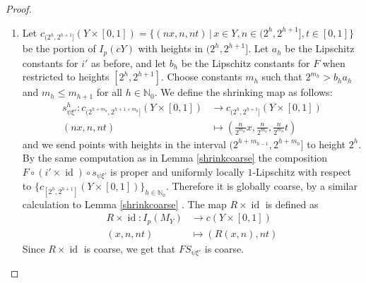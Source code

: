 \documentclass[a4paper,11pt]{article}
\theoremstyle{definition}
\theoremstyle{plain}
\theoremstyle{remark}
\DeclareMathOperator{\id}{id}
\begin{document}
{\begin{proof}
\begin{enumerate}
Let $b_{h}$ be the Lipschitz constant of $\xi'$ (thought of as a map $\tilde{M}_{Y}\rightarrow M_{X}$) restricted to the set $\coprod_{k\leq h} \tilde{M}^h$. By previous arguments, after descending to the quotient, $b_h$ is an approxiate Lipschitz constant for $M_{[1,2^{h+1}]} \subset M_{Y}$ with the subspace metric as well as for $\pi (\tilde{M}^h)$ equipped with the path metric. Since $i'$ is height-preserving, the composition $\xi'i'$ has Lipschitz constant $b_{h}a_{h}$. Choose constants $m_{h}$ such that $2^{m_{h}}>b_{h}a_{h}$ and $m_{h}\leq m_{h+1}$ for all $h\in \mathbb{N}_{0}$. By the same construction as in Lemma \ref{shrinkcoarse} we can define a shrinking map $s_{\xi'}$ such that the composition $\xi' i' s_{\xi'}$ is proper and  uniformly locally $1$-Lipschitz with respect to $\{c_{[2^h,2^{h+1}]} Y\}_{h\in \mathbb{N}_{0}}$. Note that we had to make the map $i'$ continuous rather than just coarse, because even a uniformly bounded discontinuity can become arbitrarily large under post-composition with $\xi'$ if the Lipschitz constants $b_{h}$ are unbounded. Precomposing with the coarse map $R$ gives us the desired result.

\item Let $c_{(2^{h},2^{h+1}]}(Y\times [0,1]) = \{(nx,n,nt)\,|\, x\in Y,  n \in (2^{h},2^{h+1}], t\in [0,1]\}$ be the portion of $I_{p}(cY)$ with heights in $(2^{h},2^{h+1}]$. Let $a_{h}$ be the Lipschitz constants for $i'$ as before, and let $b_{h}$ be the Lipschitz constants for $F$ when restricted to heights $[2^{h},2^{h+1}]$. Choose constants $m_{h}$ such that $2^{m_{h}}>b_{h}a_{h}$ and $m_{h}\leq m_{h+1}$ for all $h\in \mathbb{N}_{0}$. We define the shrinking map as follows: 
\begin{align*}
s^{h}_{\psi \xi'}: c_{(2^{h+m_{h}},2^{h+1+m_{h}}]}(Y\times [0,1])&\longrightarrow c_{(2^{h},2^{h+1}]}(Y\times [0,1])\\
(nx,n,nt) &\longmapsto (\frac{n}{2^{m_{h}}}x,\frac{n}{2^{m_{h}}} , \frac{n}{2^{m_{h}}}t)
\end{align*}
and we send points with heights in the interval $(2^{h+m_{h-1}}, 2^{h+m_{h}}]$ to height $2^h$. By the same computation as in Lemma \ref{shrinkcoarse} the composition $F\circ (i'\times \id)\circ s_{\psi \xi'}$ is proper and uniformly locally $1$-Lipschitz with respect to $\{c_{[2^h,2^{h+1}]}(Y \times [0,1])\}_{h\in \mathbb{N}_0}$. Therefore it is globally coarse, by a similar calculation to Lemma \ref{shrinkcoarse} . The map $R\times \id$ is defined as
\begin{align*}
R\times \id: I_{p}(M_{Y})&\rightarrow c(Y\times [0,1])\\
(x,n,nt) &\mapsto (R(x,n),nt)
\end{align*} Since $R\times \id$ is coarse, we get that $FS_{\psi \xi'}$ is coarse. 


\end{enumerate}
\end{proof}}
\end{document}
